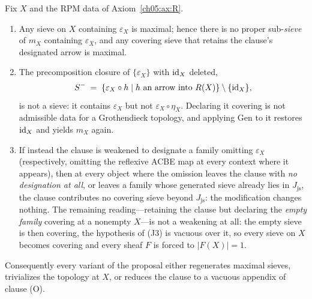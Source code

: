 \begin{proposition}
\label{ch05:prop:repair2}
Fix $X$ and the RPM data of Axiom~\ref{ch05:ax:R}.
\begin{enumerate}
\item Any sieve on $X$ containing $\varepsilon_X$ is maximal; hence there is
no proper sub-\emph{sieve} of $m_X$ containing $\varepsilon_X$, and any
covering sieve that retains the clause's designated arrow is maximal.
\item The precomposition closure of $\{\varepsilon_X\}$ with $\mathrm{id}_X$ deleted,
\[
S^{-} \;=\;
\{\varepsilon_X\circ h \mid h \text{ an arrow into } R(X)\}
\setminus\{\mathrm{id}_X\},
\]
is not a sieve: it contains $\varepsilon_X$ but not
$\varepsilon_X\circ\eta_X$. Declaring it covering is not admissible data
for a Grothendieck topology, and applying $\mathrm{Gen}$ to it restores
$\mathrm{id}_X$ and yields $m_X$ again.
\item If instead the clause is weakened to designate a family omitting
$\varepsilon_X$ (respectively, omitting the reflexive ACBE map at every
context where it appears), then at every object where the omission leaves
the clause with \emph{no designation at all}, or leaves a family whose
generated sieve already lies in $J_{\mathrm{js}}$, the clause contributes
no covering sieve beyond $J_{\mathrm{js}}$: the modification changes
nothing. The remaining reading---retaining the clause but declaring the
\emph{empty family} covering at a nonempty $X$---is not a weakening at all:
the empty sieve is then covering, the hypothesis of (J3) is vacuous over
it, so every sieve on $X$ becomes covering and every sheaf $F$ is forced to
$|F(X)|=1$.
\end{enumerate}
Consequently every variant of the proposal either regenerates maximal
sieves, trivializes the topology at $X$, or reduces the clause to a vacuous
appendix of clause (O).
\end{proposition}

